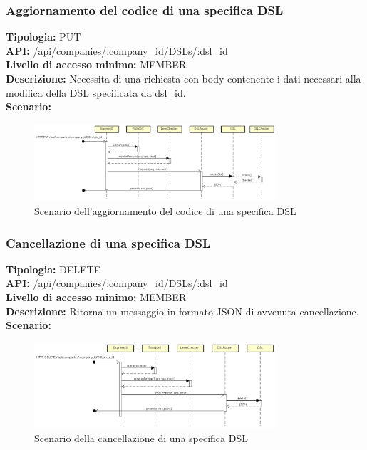 \newpage
\subsubsection{Aggiornamento del codice di una specifica DSL}
\textbf{Tipologia:} PUT \\
\textbf{API:} /api/companies/:company\_id/DSLs/:dsl\_id \\
\textbf{Livello di accesso minimo:} MEMBER \\
\textbf{Descrizione:} Necessita di una richiesta con body contenente i dati necessari alla modifica della DSL specificata da dsl\_id. \\
\textbf{Scenario:}
\begin{figure}[h]
\centering
\includegraphics[width=0.8\textwidth]{res/sections/backend/(PUT)dsl.png}
\caption{Scenario dell'aggiornamento del codice di una specifica DSL}
\end{figure}

\newpage
\subsubsection{Cancellazione di una specifica DSL}
\textbf{Tipologia:} DELETE \\
\textbf{API:} /api/companies/:company\_id/DSLs/:dsl\_id \\
\textbf{Livello di accesso minimo:} MEMBER \\
\textbf{Descrizione:} Ritorna un messaggio in formato JSON di avvenuta cancellazione. \\
\textbf{Scenario:} 
\begin{figure}[h]
\centering
\includegraphics[width=0.8\textwidth]{res/sections/backend/(DELETE)dsl.png}
\caption{Scenario della cancellazione di una specifica DSL}
\end{figure}

